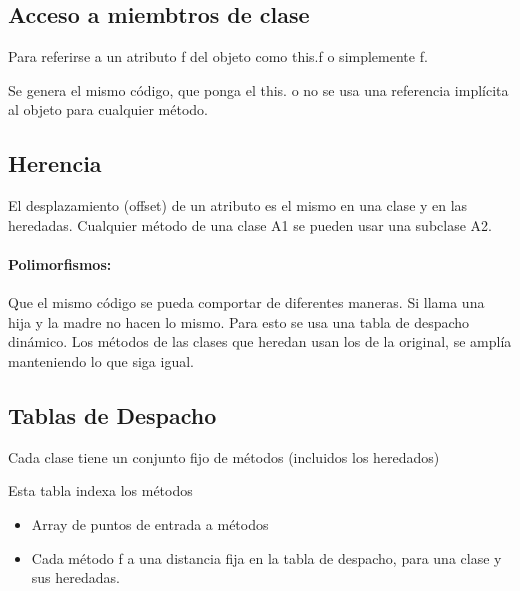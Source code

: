 \documentclass[12pt, twoside, openright]{report} %
\begin{document}
\subsection{Acceso a miembtros de clase}
Para referirse a un atributo f del objeto como this.f o simplemente f.

Se genera el mismo código, que ponga el this. o no se usa una referencia implícita al objeto para cualquier método.

\subsection{Herencia}
El desplazamiento (offset) de un atributo es el mismo en una clase y en las heredadas. Cualquier método de una clase A1 se pueden usar una subclase A2.

\paragraph{Polimorfismos:} Que el mismo código se pueda comportar de diferentes maneras. Si llama una hija y la madre no hacen lo mismo. Para esto se usa una tabla de despacho dinámico.
Los métodos de las clases que heredan usan los de la original, se amplía manteniendo lo que siga igual.
\pagebreak
\subsection{Tablas de Despacho}
Cada clase tiene un conjunto fijo de métodos (incluidos los heredados)

Esta tabla indexa los métodos
\begin{itemize}
	\item Array de puntos de entrada a métodos
	\item Cada método f a una distancia fija en la tabla de despacho, para una clase y sus heredadas.
\end{itemize}
\end{document}
